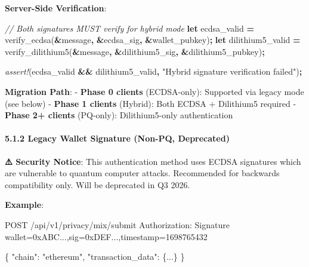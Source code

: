 \documentclass[
  11pt,
]{article}
\newenvironment{Shaded}{\begin{snugshade}}{\end{snugshade}}
\newcommand{\CommentTok}[1]{\textcolor[rgb]{0.56,0.35,0.01}{\textit{#1}}}
\newcommand{\KeywordTok}[1]{\textcolor[rgb]{0.13,0.29,0.53}{\textbf{#1}}}
\newcommand{\NormalTok}[1]{#1}
\newcommand{\OperatorTok}[1]{\textcolor[rgb]{0.81,0.36,0.00}{\textbf{#1}}}
\newcommand{\PreprocessorTok}[1]{\textcolor[rgb]{0.56,0.35,0.01}{\textit{#1}}}
\newcommand{\StringTok}[1]{\textcolor[rgb]{0.31,0.60,0.02}{#1}}
\begin{document}
\textbf{Server-Side Verification}:

\begin{Shaded}
\begin{Highlighting}[]
\CommentTok{// Both signatures MUST verify for hybrid mode}
\KeywordTok{let}\NormalTok{ ecdsa\_valid }\OperatorTok{=}\NormalTok{ verify\_ecdsa(}\OperatorTok{\&}\NormalTok{message}\OperatorTok{,} \OperatorTok{\&}\NormalTok{ecdsa\_sig}\OperatorTok{,} \OperatorTok{\&}\NormalTok{wallet\_pubkey)}\OperatorTok{;}
\KeywordTok{let}\NormalTok{ dilithium5\_valid }\OperatorTok{=}\NormalTok{ verify\_dilithium5(}\OperatorTok{\&}\NormalTok{message}\OperatorTok{,} \OperatorTok{\&}\NormalTok{dilithium5\_sig}\OperatorTok{,} \OperatorTok{\&}\NormalTok{dilithium5\_pubkey)}\OperatorTok{;}

\PreprocessorTok{assert!}\NormalTok{(ecdsa\_valid }\OperatorTok{\&\&}\NormalTok{ dilithium5\_valid}\OperatorTok{,} \StringTok{"Hybrid signature verification failed"}\NormalTok{)}\OperatorTok{;}
\end{Highlighting}
\end{Shaded}

\textbf{Migration Path}: - \textbf{Phase 0 clients} (ECDSA-only):
Supported via legacy mode (see below) - \textbf{Phase 1 clients}
(Hybrid): Both ECDSA + Dilithium5 required - \textbf{Phase 2+ clients}
(PQ-only): Dilithium5-only authentication

\hypertarget{legacy-wallet-signature-non-pq-deprecated}{%
\paragraph{5.1.2 Legacy Wallet Signature (Non-PQ,
Deprecated)}\label{legacy-wallet-signature-non-pq-deprecated}}

\textbf{⚠️ Security Notice}: This authentication method uses ECDSA
signatures which are vulnerable to quantum computer attacks. Recommended
for backwards compatibility only. Will be deprecated in Q3 2026.

\textbf{Example}:

\begin{Shaded}
\begin{Highlighting}[]
\NormalTok{POST /api/v1/privacy/mix/submit}
\NormalTok{Authorization: Signature wallet=0xABC...,sig=0xDEF...,timestamp=1698765432}

\NormalTok{\{}
\NormalTok{  "chain": "ethereum",}
\NormalTok{  "transaction\_data": \{...\}}
\NormalTok{\}}
\end{Highlighting}
\end{Shaded}
\end{document}
